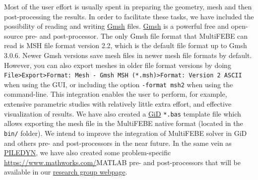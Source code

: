 \documentclass[a4paper,fleqn]{book}
\begin{document}
Most of the user effort is usually spent in preparing the geometry, mesh and then post-processing the results. In order to facilitate these tasks, we have included the possibility of reading and writing \href{https://gmsh.info}{Gmsh} files. \href{https://gmsh.info}{Gmsh} is a powerful free and open-source pre- and post-processor. The only Gmsh file format that MultiFEBE can read is MSH file format version 2.2, which is the default file format up to Gmsh 3.0.6. Newer Gmsh versions save mesh files in newer mesh file formats by default. However, you can also export meshes in older file format versions by doing \texttt{File>Export>Format: Mesh - Gmsh MSH (*.msh)>Format: Version 2 ASCII} when using the GUI, or including the option \texttt{-format msh2} when using the command-line. This integration enables the user to perform, for example, extensive parametric studies with relatively little extra effort, and effective visualization of results. We have also created a \href{https://www.gidhome.com}{GiD} \texttt{*.bas} template file which allows exporting the mesh file in the MultiFEBE native format (located in the \texttt{bin/} folder). We intend to improve the integration of MultiFEBE solver in GiD and others pre- and post-processors in the near future. In the same vein as \href{http://www.mmc.siani.es/software/piledyn}{PILEDYN}, we have also created some problem-specific \url{https://www.mathworks.com/}{MATLAB} pre- and post-processors that will be available in our \href{http://www.mmc.siani.es/software/}{research group webpage}.
\end{document}
